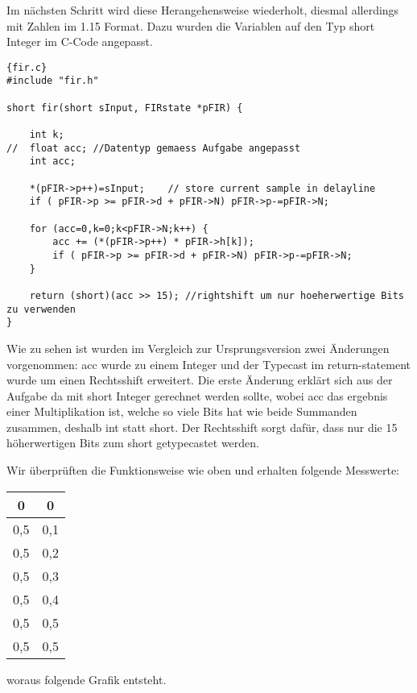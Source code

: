  Im nächsten Schritt wird diese Herangehensweise wiederholt, diesmal allerdings mit Zahlen im 1.15 Format. Dazu wurden die Variablen auf den Typ short Integer im C-Code angepasst.\\
 \begin{adjustbox}{width=\textwidth,height=\textheight,keepaspectratio}
 \begin{lstlisting}[title=fir.c]{fir.c}
#include "fir.h"

short fir(short sInput, FIRstate *pFIR) {

	int k;
//	float acc; //Datentyp gemaess Aufgabe angepasst
	int acc;
	
	*(pFIR->p++)=sInput;	// store current sample in delayline
	if ( pFIR->p >= pFIR->d + pFIR->N) pFIR->p-=pFIR->N;

	for (acc=0,k=0;k<pFIR->N;k++) {
		acc += (*(pFIR->p++) * pFIR->h[k]);
		if ( pFIR->p >= pFIR->d + pFIR->N) pFIR->p-=pFIR->N;
	}
	
	return (short)(acc >> 15); //rightshift um nur hoeherwertige Bits zu verwenden
}
\end{lstlisting}
\end{adjustbox}
Wie zu sehen ist wurden im Vergleich zur Ursprungsversion zwei Änderungen vorgenommen: acc wurde zu einem Integer und der Typecast im return-statement wurde um einen Rechtsshift erweitert. Die erste \"Anderung erklärt sich aus der Aufgabe da mit short Integer gerechnet werden sollte, wobei acc das ergebnis einer Multiplikation ist, welche so viele Bits hat wie beide Summanden zusammen, deshalb int statt short. Der Rechtsshift sorgt daf\"ur, dass nur die 15 h\"oherwertigen Bits zum short getypecastet werden.\\\par
Wir \"uberprüften die Funktionsweise wie oben und erhalten folgende 
Messwerte:\\
\begin{center}
\begin{tabular}{|c|c|}
\hline 
0 & 0 \\ 
\hline 
0,5 & 0,1 \\ 
\hline 
0,5 & 0,2 \\ 
\hline 
0,5 & 0,3 \\ 
\hline 
0,5 & 0,4 \\ 
\hline 
0,5 & 0,5 \\ 
\hline 
0,5 & 0,5 \\ 
\hline 
\end{tabular} 
\end{center}
woraus folgende Grafik entsteht.
